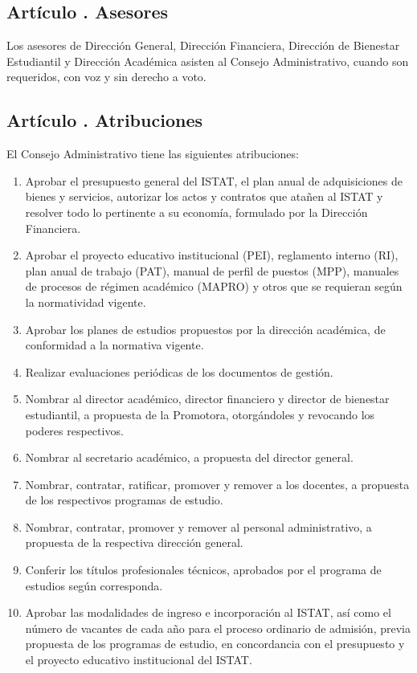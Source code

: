\subsection{Artículo . Asesores}
\addtocounter{ns}{1}
Los asesores de Dirección General, Dirección Financiera, Dirección de Bienestar Estudiantil y Dirección Académica asisten al Consejo Administrativo, cuando son requeridos, con voz y sin derecho a voto. 
\subsection{Artículo . Atribuciones}
\addtocounter{ns}{1}
El Consejo Administrativo tiene las siguientes atribuciones:
\begin{enumerate}
\item Aprobar el presupuesto general del ISTAT, el plan anual de adquisiciones de bienes y servicios, autorizar los actos y contratos que atañen al ISTAT y resolver todo lo pertinente a su economía, formulado por la Dirección Financiera.
\item Aprobar el proyecto educativo institucional (PEI), reglamento interno (RI), plan anual de trabajo (PAT), manual de perfil de puestos (MPP), manuales de procesos de régimen académico (MAPRO) y otros que se requieran según la normatividad vigente.
\item Aprobar los planes de estudios propuestos por la dirección académica, de conformidad a la normativa vigente.  
\item Realizar evaluaciones periódicas de los documentos de gestión. 
\item Nombrar al director académico, director financiero y director de bienestar estudiantil, a propuesta de la Promotora, otorgándoles y revocando los poderes respectivos.  
\item Nombrar al secretario académico, a propuesta del director general. 
\item Nombrar, contratar, ratificar, promover y remover a los docentes, a propuesta de los respectivos programas de estudio. 
\item Nombrar, contratar, promover y remover al personal administrativo, a propuesta de la respectiva dirección general. 
\item Conferir los títulos profesionales técnicos, aprobados por el programa de estudios según corresponda.  
\item Aprobar las modalidades de ingreso e incorporación al ISTAT, así como el número de vacantes de cada año para el proceso ordinario de admisión, previa propuesta de los programas de estudio, en concordancia con el presupuesto y el proyecto educativo institucional del ISTAT. 

\end{enumerate}
